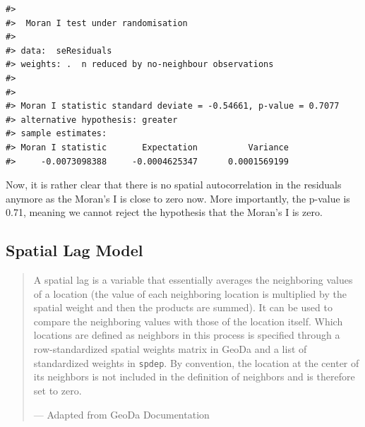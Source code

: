 \documentclass[
  11pt,
]{book}
\newenvironment{Shaded}{\begin{snugshade}}{\end{snugshade}}
\newcommand{\AttributeTok}[1]{\textcolor[rgb]{0.77,0.63,0.00}{#1}}
\newcommand{\CommentTok}[1]{\textcolor[rgb]{0.56,0.35,0.01}{\textit{#1}}}
\newcommand{\ConstantTok}[1]{\textcolor[rgb]{0.00,0.00,0.00}{#1}}
\newcommand{\DecValTok}[1]{\textcolor[rgb]{0.00,0.00,0.81}{#1}}
\newcommand{\FunctionTok}[1]{\textcolor[rgb]{0.00,0.00,0.00}{#1}}
\newcommand{\NormalTok}[1]{#1}
\newcommand{\OtherTok}[1]{\textcolor[rgb]{0.56,0.35,0.01}{#1}}
\newcommand{\SpecialCharTok}[1]{\textcolor[rgb]{0.00,0.00,0.00}{#1}}
\begin{document}
\begin{Shaded}
\end{Shaded}

\begin{verbatim}
#> 
#>  Moran I test under randomisation
#> 
#> data:  seResiduals  
#> weights: .  n reduced by no-neighbour observations
#>   
#> 
#> Moran I statistic standard deviate = -0.54661, p-value = 0.7077
#> alternative hypothesis: greater
#> sample estimates:
#> Moran I statistic       Expectation          Variance 
#>     -0.0073098388     -0.0004625347      0.0001569199
\end{verbatim}

Now, it is rather clear that there is no spatial autocorrelation in the residuals anymore as the Moran's I is close to zero now. More importantly, the p-value is 0.71, meaning we cannot reject the hypothesis that the Moran's I is zero.

\hypertarget{spatial-lag-model}{%
\subsection{Spatial Lag Model}\label{spatial-lag-model}}

\begin{quote}
A spatial lag is a variable that essentially averages the neighboring values of a location (the value of each neighboring location is multiplied by the spatial weight and then the products are summed). It can be used to compare the neighboring values with those of the location itself. Which locations are defined as neighbors in this process is specified through a row-standardized spatial weights matrix in GeoDa and a list of standardized weights in \texttt{spdep}. By convention, the location at the center of its neighbors is not included in the definition of neighbors and is therefore set to zero.

--- Adapted from GeoDa Documentation
\end{quote}
\end{document}
